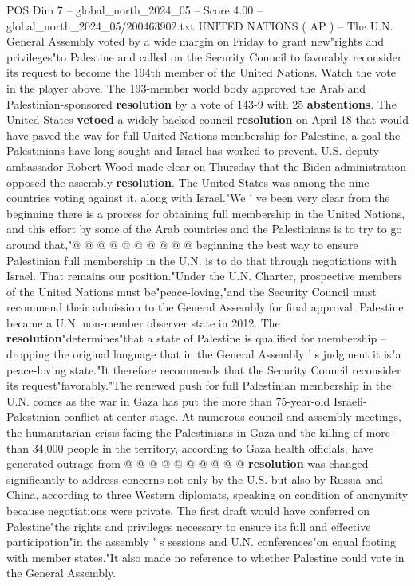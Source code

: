 \begin{textsample}{POS Dim 7 – global\_north\_2024\_05 – Score 4.00 – global\_north\_2024\_05/200463902.txt}  \label{ex:f7_pos_262}
UNITED NATIONS ( AP ) -- The U.N.
General Assembly voted by a wide margin on Friday to grant new"rights and privileges"to Palestine and called on the Security Council to favorably reconsider its request to become the 194th member of the United Nations.
Watch the vote in the player above.
The 193-member world body approved the Arab and Palestinian-sponsored \textbf{resolution} by a vote of 143-9 with 25 \textbf{abstentions}.
The United States \textbf{vetoed} a widely backed council \textbf{resolution} on April 18 that would have paved the way for full United Nations membership for Palestine, a goal the Palestinians have long sought and Israel has worked to prevent.
U.S. deputy ambassador Robert Wood made clear on Thursday that the Biden administration opposed the assembly \textbf{resolution}.
The United States was among the nine countries voting against it, along with Israel."We ' ve been very clear from the beginning there is a process for obtaining full membership in the United Nations, and this effort by some of the Arab countries and the Palestinians is to try to go around that,"@ @ @ @ @ @ @ @ @ @ beginning the best way to ensure Palestinian full membership in the U.N. is to do that through negotiations with Israel.
That remains our position."Under the U.N.
Charter, prospective members of the United Nations must be"peace-loving,"and the Security Council must recommend their admission to the General Assembly for final approval.
Palestine became a U.N. non-member observer state in 2012.
The \textbf{resolution}"determines"that a state of Palestine is qualified for membership -- dropping the original language that in the General Assembly ' s judgment it is"a peace-loving state."It therefore recommends that the Security Council reconsider its request"favorably."The renewed push for full Palestinian membership in the U.N. comes as the war in Gaza has put the more than 75-year-old Israeli-Palestinian conflict at center stage.
At numerous council and assembly meetings, the humanitarian crisis facing the Palestinians in Gaza and the killing of more than 34,000 people in the territory, according to Gaza health officials, have generated outrage from @ @ @ @ @ @ @ @ @ @ \textbf{resolution} was changed significantly to address concerns not only by the U.S. but also by Russia and China, according to three Western diplomats, speaking on condition of anonymity because negotiations were private.
The first draft would have conferred on Palestine"the rights and privileges necessary to ensure its full and effective participation"in the assembly ' s sessions and U.N. conferences"on equal footing with member states."It also made no reference to whether Palestine could vote in the General Assembly.

\end{textsample}
